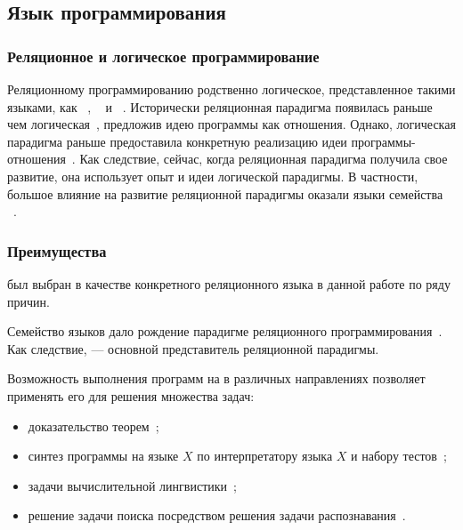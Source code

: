\subsection{Язык программирования \miniKanren{}}


\subsubsection{Реляционное и логическое программирование}

Реляционному программированию родственно логическое, представленное такими языками, как \prolog{}~\cite{Malpas1987prolog}, \mercury{}~\cite{SOMOGYI199617} и \curry{}~\cite{Hanus2016CIF}.
Исторически реляционная парадигма появилась раньше чем логическая~\cite{MacLennan1981IRP}, предложив идею программы как отношения.
Однако, логическая парадигма раньше предоставила конкретную реализацию идеи программы-отношения~\cite{Malpas1987prolog}.
Как следствие, сейчас, когда реляционная парадигма получила свое развитие, она использует опыт и идеи логической парадигмы.
В частности, большое влияние на развитие реляционной парадигмы оказали языки семейства \prolog{}~\cite{Nadathur1988OLP, Wielemaker2012TPL, Swift2012XSB}.


\subsubsection{Преимущества \miniKanren{}}

\miniKanren{} был выбран в качестве конкретного реляционного языка в данной работе по ряду причин.

Семейство языков \miniKanren{} дало рождение парадигме реляционного программирования~\cite{Byrd2009RPM, Friedman2005TRS, hemann2013ukanren}.
Как следствие, \miniKanren{} --- основной представитель реляционной парадигмы.

Возможность выполнения программ на \miniKanren{} в различных направлениях позволяет применять его для решения множества задач:
\begin{itemize}
    \item доказательство теорем~\cite{Near2008TAP};
    \item синтез программы на языке $X$ по интерпретатору языка $X$ и набору тестов~\cite{byrd2017unified};
    \item задачи вычислительной лингвистики~\cite{Varju2012UCL};
    \item решение задачи поиска посредством решения задачи распознавания~\cite{lozov2019relational}.
\end{itemize}

